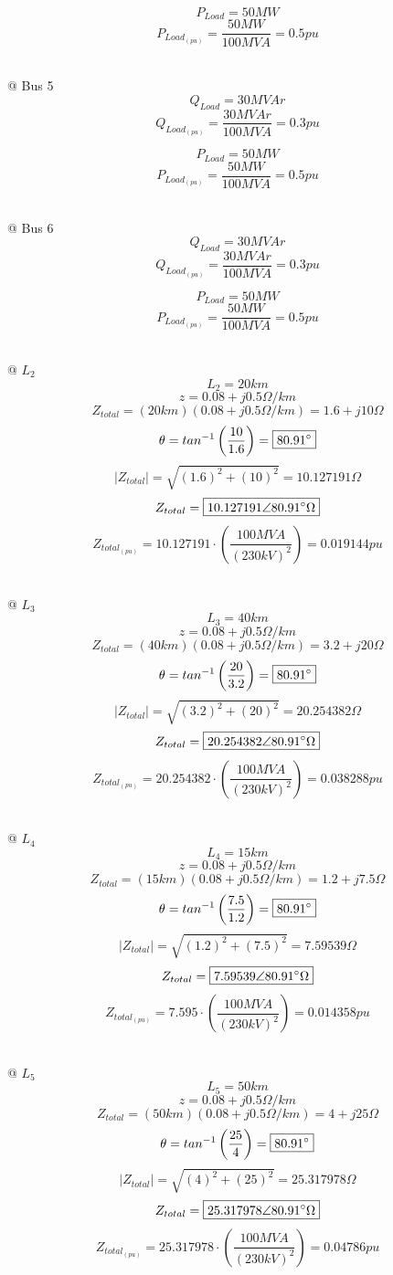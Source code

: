 \documentclass[12pt]{article}
\begin{document}
        $$P_{Load}=50MW$$
        $$P_{Load_{(pu)}}=\frac{50MW}{100MVA}=\boxed{0.5pu}$$
        
        \ \\
        @ Bus 5
        $$Q_{Load}=30MVAr$$
        $$Q_{Load_{(pu)}}=\frac{30MVAr}{100MVA}=\boxed{0.3pu}$$
        
        $$P_{Load}=50MW$$
        $$P_{Load_{(pu)}}=\frac{50MW}{100MVA}=\boxed{0.5pu}$$
        
        \ \\
        @ Bus 6
        $$Q_{Load}=30MVAr$$
        $$Q_{Load_{(pu)}}=\frac{30MVAr}{100MVA}=\boxed{0.3pu}$$
        
        $$P_{Load}=50MW$$
        $$P_{Load_{(pu)}}=\frac{50MW}{100MVA}=\boxed{0.5pu}$$

        \ \\
        @ $L_2$
        $$L_2=20km$$
        $$z=0.08+j0.5\Omega/km$$
        $$Z_{total}=(20km)(0.08+j0.5\Omega/km)=\boxed{1.6+j10\Omega}$$
        $$\theta=tan^{-1}\left(\frac{10}{1.6}\right)=\boxed{80.91\degree}$$
        $$|Z_{total}|=\sqrt{(1.6)^2+(10)^2}=\boxed{10.127191\Omega}$$
        $$Z_{total}=\boxed{10.127191\angle80.91\degree\Omega}$$
        $$Z_{total_{(pu)}}=10.127191\cdot\left(\frac{100MVA}{(230kV)^2}\right)=\boxed{0.019144pu}$$

        \ \\
        @ $L_3$
        $$L_3=40km$$
        $$z=0.08+j0.5\Omega/km$$
        $$Z_{total}=(40km)(0.08+j0.5\Omega/km)=\boxed{3.2+j20\Omega}$$
        $$\theta=tan^{-1}\left(\frac{20}{3.2}\right)=\boxed{80.91\degree}$$
        $$|Z_{total}|=\sqrt{(3.2)^2+(20)^2}=\boxed{20.254382\Omega}$$
        $$Z_{total}=\boxed{20.254382\angle80.91\degree\Omega}$$
        $$Z_{total_{(pu)}}=20.254382\cdot\left(\frac{100MVA}{(230kV)^2}\right)=\boxed{0.038288pu}$$

        \ \\
        @ $L_4$
        $$L_4=15km$$
        $$z=0.08+j0.5\Omega/km$$
        $$Z_{total}=(15km)(0.08+j0.5\Omega/km)=\boxed{1.2+j7.5\Omega}$$
        $$\theta=tan^{-1}\left(\frac{7.5}{1.2}\right)=\boxed{80.91\degree}$$
        $$|Z_{total}|=\sqrt{(1.2)^2+(7.5)^2}=\boxed{7.59539\Omega}$$
        $$Z_{total}=\boxed{7.59539\angle80.91\degree\Omega}$$
        $$Z_{total_{(pu)}}=7.595\cdot\left(\frac{100MVA}{(230kV)^2}\right)=\boxed{0.014358pu}$$

        \ \\
        @ $L_5$
        $$L_5=50km$$
        $$z=0.08+j0.5\Omega/km$$
        $$Z_{total}=(50km)(0.08+j0.5\Omega/km)=\boxed{4+j25\Omega}$$
        $$\theta=tan^{-1}\left(\frac{25}{4}\right)=\boxed{80.91\degree}$$
        $$|Z_{total}|=\sqrt{(4)^2+(25)^2}=\boxed{25.317978\Omega}$$
        $$Z_{total}=\boxed{25.317978\angle80.91\degree\Omega}$$
        $$Z_{total_{(pu)}}=25.317978\cdot\left(\frac{100MVA}{(230kV)^2}\right)=\boxed{0.04786pu}$$
\end{document}
